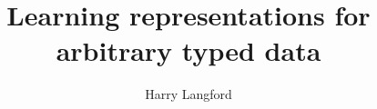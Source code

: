\documentclass[11pt]{article} %
\title{Learning representations for arbitrary typed data}
\author{Harry Langford}
\date{}
\begin{document}
%
\maketitle

\begin{abstract}
\noindent 
\end{abstract}











\end{document}
